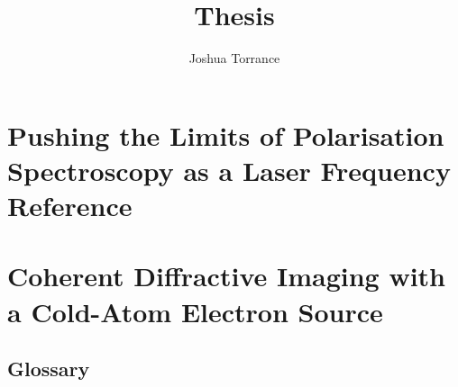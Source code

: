 \documentclass[11pt]{report}
\begin{document}
\title{Thesis}

\author{Joshua Torrance}

\maketitle






\tableofcontents


\part{Pushing the Limits of Polarisation Spectroscopy as a Laser Frequency Reference}


\part{Coherent Diffractive Imaging with a Cold-Atom Electron Source}

\appendix
\chapter{Glossary}
\printglossary


\renewcommand\bibname{References}

\end{document}
